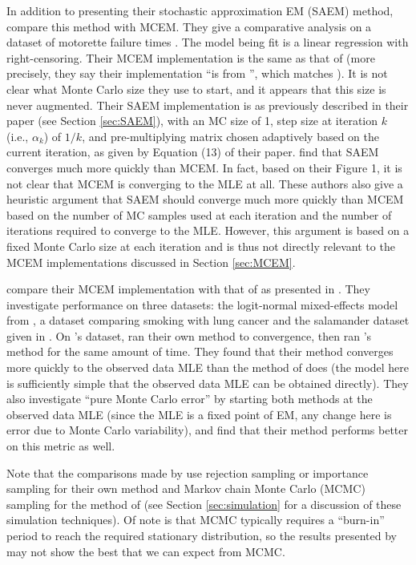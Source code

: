 \documentclass[11pt, oneside]{article}   	%
\begin{document}
In addition to presenting their stochastic approximation EM (SAEM) method, \citet{Gu98I} compare this method with MCEM. They give a comparative analysis on a dataset of motorette failure times \citep[see][for a diagram and explanation of what a motorette is]{Rai16}. The model being fit is a linear regression with right-censoring. Their MCEM implementation is the same as that of \citet{Wei90} (more precisely, they say their implementation ``is from \citet{Tan93}'', which matches \citeauthor{Wei90}). It is not clear what Monte Carlo size they use to start, and it appears that this size is never augmented. Their SAEM implementation is as previously described in their paper (see Section \ref{sec:SAEM}), with an MC size of 1, step size at iteration $k$ (i.e., $\alpha_k$) of $1/k$, and pre-multiplying matrix chosen adaptively based on the current iteration, as given by Equation (13) of their paper. \citeauthor{Gu98I} find that SAEM converges much more quickly than MCEM. In fact, based on their Figure 1, it is not clear that MCEM is converging to the MLE at all. These authors also give a heuristic argument that SAEM should converge much more quickly than MCEM based on the number of MC samples used at each iteration and the number of iterations required to converge to the MLE. However, this argument is based on a fixed Monte Carlo size at each iteration and is thus not directly relevant to the MCEM implementations discussed in Section \ref{sec:MCEM}.

\citet{Boo99} compare their MCEM implementation with that of \citet{Wei90} as presented in \citet{McC97}. They investigate performance on three datasets: the logit-normal mixed-effects model from \citet{McC97}, a dataset comparing smoking with lung cancer \citep{Dor54} and the salamander dataset given in \citet{McC89}. On \citeauthor{McC97}'s dataset, \citeauthor{Boo99} ran their own method to convergence, then ran \citeauthor{Wei90}'s method for the same amount of time. They found that their method converges more quickly to the observed data MLE than the method of \citeauthor{Wei90} does (the model here is sufficiently simple that the observed data MLE can be obtained directly). They also investigate ``pure Monte Carlo error'' by starting both methods at the observed data MLE (since the MLE is a fixed point of EM, any change here is error due to Monte Carlo variability), and find that their method performs better on this metric as well.

Note that the comparisons made by \citeauthor{Boo99} use rejection sampling or importance sampling for their own method and Markov chain Monte Carlo (MCMC) sampling for the method of \citet{Wei90} (see Section \ref{sec:simulation} for a discussion of these simulation techniques). Of note is that MCMC typically requires a ``burn-in'' period to reach the required stationary distribution, so the results presented by \citeauthor{Boo99} may not show the best that we can expect from MCMC.
\end{document}
